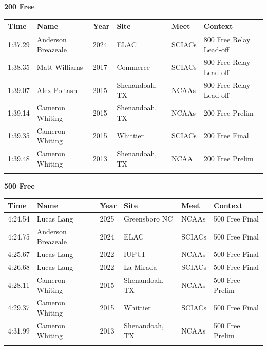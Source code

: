 \vspace{1.2em}
\noindent\begin{minipage}[t]{0.98\textwidth}
\centering
\textbf{\textcolor{teamprimary}{200 Free}}\par
\vspace{0.5em}
\centering
\small
\renewcommand{\arraystretch}{1.0}
\setlength{\tabcolsep}{4pt}
\begin{tabular}{@{}p{2.0cm}p{3.2cm}p{1.2cm}p{2.0cm}p{2.0cm}p{2.5cm}@{}}
\toprule
\textbf{Time} & \textbf{Name} & \textbf{Year} & \textbf{Site} & \textbf{Meet} & \textbf{Context} \\
\midrule
1:37.29 & Anderson Breazeale & 2024 & ELAC & SCIACs & 800 Free Relay Lead-off \\
1:38.35 & Matt Williams & 2017 & Commerce & SCIACs & 800 Free Relay Lead-off \\
1:39.07 & Alex Poltash & 2015 & Shenandoah, TX & NCAAs & 800 Free Relay Lead-off \\
1:39.14 & Cameron Whiting & 2015 & Shenandoah, TX & NCAAs & 200 Free Prelim \\
1:39.35 & Cameron Whiting & 2015 & Whittier & SCIACs & 200 Free Final \\
1:39.48 & Cameron Whiting & 2013 & Shenandoah, TX & NCAA & 200 Free Prelim \\
\bottomrule
\vspace{0.5em}
\end{tabular}
\end{minipage}
\vspace{1.2em}
\noindent\begin{minipage}[t]{0.98\textwidth}
\centering
\textbf{\textcolor{teamprimary}{500 Free}}\par
\vspace{0.5em}
\centering
\small
\renewcommand{\arraystretch}{1.0}
\setlength{\tabcolsep}{4pt}
\begin{tabular}{@{}p{2.0cm}p{3.2cm}p{1.2cm}p{2.0cm}p{2.0cm}p{2.5cm}@{}}
\toprule
\textbf{Time} & \textbf{Name} & \textbf{Year} & \textbf{Site} & \textbf{Meet} & \textbf{Context} \\
\midrule
4:24.54 & Lucas Lang & 2025 & Greensboro NC & NCAAs & 500 Free Final \\
4:24.75 & Anderson Breazeale & 2024 & ELAC & SCIACs & 500 Free Final \\
4:25.67 & Lucas Lang & 2022 & IUPUI & NCAAs & 500 Free Final \\
4:26.68 & Lucas Lang & 2022 & La Mirada & SCIACs & 500 Free Final \\
4:28.11 & Cameron Whiting & 2015 & Shenandoah, TX & NCAAs & 500 Free Prelim \\
4:29.37 & Cameron Whiting & 2015 & Whittier & SCIACs & 500 Free Final \\
4:31.99 & Cameron Whiting & 2013 & Shenandoah, TX & NCAAs & 500 Free Prelim \\
\bottomrule
\vspace{0.5em}
\end{tabular}
\end{minipage}
